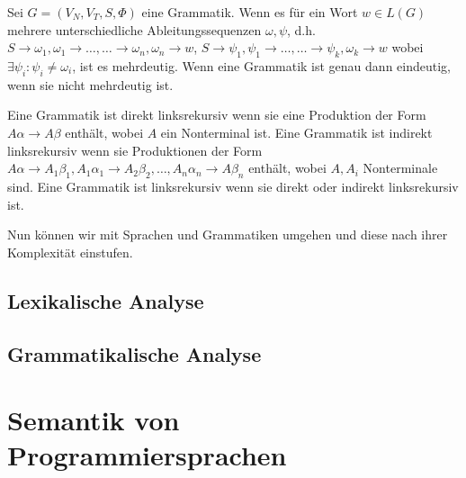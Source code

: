 \begin{defn}
Sei $G=(V_N,V_T,S,\Phi)$ eine Grammatik. Wenn es für ein Wort $w \in L(G)$ mehrere
unterschiedliche Ableitungssequenzen $\omega,\psi$, d.h. $S \to \omega_1, \omega_1 \to \ldots, \ldots \to \omega_n, \omega_n \to w$,
                                                         $S \to \psi_1, \psi_1 \to \ldots, \ldots \to \psi_k, \omega_k \to w$
wobei $\exists \psi_i : \psi_i \neq \omega_i$, ist es mehrdeutig. Wenn eine Grammatik ist genau dann eindeutig, wenn sie nicht mehrdeutig ist.
\end{defn}

\begin{defn}[Linksrekursiv]
Eine Grammatik ist direkt linksrekursiv wenn sie eine Produktion der Form $A\alpha \to A\beta$ enthält, wobei $A$ ein Nonterminal ist.
Eine Grammatik ist indirekt linksrekursiv wenn sie Produktionen der Form $A\alpha \to A_1\beta_1, A_1 \alpha_1 \to A_2\beta_2, \ldots, A_n \alpha_n \to A\beta_n$ enthält, wobei $A,A_i$ Nonterminale sind.
Eine Grammatik ist linksrekursiv wenn sie direkt oder indirekt linksrekursiv ist.
\end{defn}

Nun können wir mit Sprachen und Grammatiken umgehen und diese nach ihrer Komplexität einstufen.
\subsection{Lexikalische Analyse}
\subsection{Grammatikalische Analyse}
\section{Semantik von Programmiersprachen}
